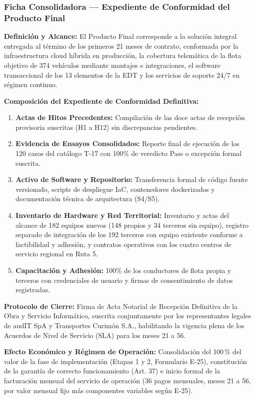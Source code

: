 \subsubsection*{Ficha Consolidadora — Expediente de Conformidad del Producto Final}\label{sec:9-proto-producto-final}
\par\noindent\textbf{Definición y Alcance:} El Producto Final corresponde a la solución integral entregada al término de los primeros 21 meses de contrato, conformada por la infraestructura cloud híbrida en producción, la cobertura telemática de la flota objetivo de 374 vehículos mediante montajes e integraciones, el software transaccional de los 13 elementos de la EDT y los servicios de soporte 24/7 en régimen continuo.\par
\par\noindent\textbf{Composición del Expediente de Conformidad Definitiva:}
\begin{enumerate}
  \item \textbf{Actas de Hitos Precedentes:} Compilación de las doce actas de recepción provisoria suscritas (H1 a H12) sin discrepancias pendientes.
  \item \textbf{Evidencia de Ensayos Consolidados:} Reporte final de ejecución de los 120 casos del catálogo T-17 con 100\% de veredicto Pass o excepción formal suscrita.
  \item \textbf{Activo de Software y Repositorio:} Transferencia formal de código fuente versionado, scripts de despliegue IaC, contenedores dockerizados y documentación técnica de arquitectura (S4/S5).
  \item \textbf{Inventario de Hardware y Red Territorial:} Inventario y actas del alcance de 182 equipos nuevos (148 propios y 34 terceros sin equipo), registro separado de integración de los 192 terceros con equipo existente conforme a factibilidad y adhesión, y contratos operativos con los cuatro centros de servicio regional en Ruta 5.
  \item \textbf{Capacitación y Adhesión:} 100\% de los conductores de flota propia y terceros con credenciales de usuario y firmas de consentimiento de datos registradas.
\end{enumerate}
\par\noindent\textbf{Protocolo de Cierre:} Firma de Acta Notarial de Recepción Definitiva de la Obra y Servicio Informático, suscrita conjuntamente por los representantes legales de audIT SpA y Transportes Curimón S.A., habilitando la vigencia plena de los Acuerdos de Nivel de Servicio (SLA) para los meses 21 a 56.\par
\par\noindent\textbf{Efecto Económico y Régimen de Operación:} Consolidación del 100\,\% del valor de la fase de implementación (Etapas 1 y 2, Formulario E-25), constitución de la garantía de correcto funcionamiento (Art. 37) e inicio formal de la facturación mensual del servicio de operación (36 pagos mensuales, meses 21 a 56, por valor mensual fijo más componentes variables según E-25).\par
